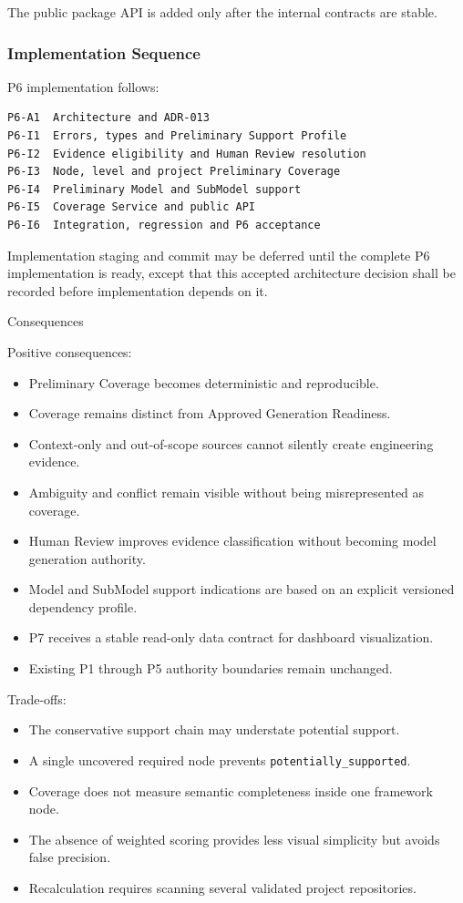 The public package API is added only after the internal contracts are stable.

\hypertarget{implementation-sequence}{%
\subsubsection{Implementation Sequence}\label{implementation-sequence}}

P6 implementation follows:

\begin{verbatim}
P6-A1  Architecture and ADR-013
P6-I1  Errors, types and Preliminary Support Profile
P6-I2  Evidence eligibility and Human Review resolution
P6-I3  Node, level and project Preliminary Coverage
P6-I4  Preliminary Model and SubModel support
P6-I5  Coverage Service and public API
P6-I6  Integration, regression and P6 acceptance
\end{verbatim}

Implementation staging and commit may be deferred until the complete P6 implementation is ready, except that this accepted architecture decision shall be recorded before implementation depends on it.

Consequences

Positive consequences:

\begin{itemize}
\tightlist
\item
  Preliminary Coverage becomes deterministic and reproducible.
\item
  Coverage remains distinct from Approved Generation Readiness.
\item
  Context-only and out-of-scope sources cannot silently create engineering evidence.
\item
  Ambiguity and conflict remain visible without being misrepresented as coverage.
\item
  Human Review improves evidence classification without becoming model generation authority.
\item
  Model and SubModel support indications are based on an explicit versioned dependency profile.
\item
  P7 receives a stable read-only data contract for dashboard visualization.
\item
  Existing P1 through P5 authority boundaries remain unchanged.
\end{itemize}

Trade-offs:

\begin{itemize}
\tightlist
\item
  The conservative support chain may understate potential support.
\item
  A single uncovered required node prevents \texttt{potentially\_supported}.
\item
  Coverage does not measure semantic completeness inside one framework node.
\item
  The absence of weighted scoring provides less visual simplicity but avoids false precision.
\item
  Recalculation requires scanning several validated project repositories.
\end{itemize}

